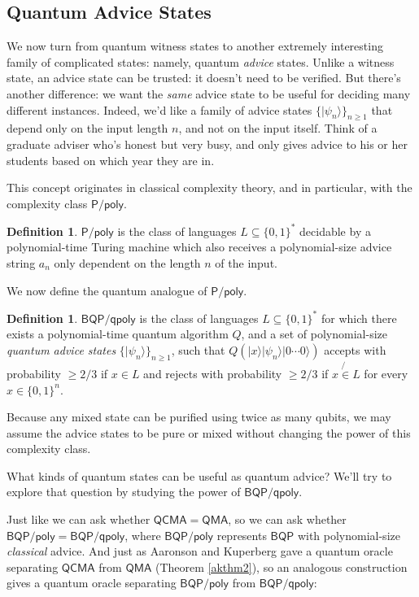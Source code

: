 \documentclass[11pt]{report}
\theoremstyle{plain}
\theoremstyle{definition}
\newtheorem{definition}[theorem]{Definition}
\renewcommand{\ket}[1]{|#1\rangle}
\begin{document}
\subsection{Quantum Advice States}

We now turn from quantum witness states to another extremely interesting family of complicated states: namely, quantum {\em advice} states.  Unlike a witness state, an advice state can
be trusted: it doesn't need to be verified.  But there's another difference: we want the {\em same} advice state to be useful for deciding many different instances.  Indeed, we'd like
a family of advice states $\{ \ket{\psi_n} \}_{n \geq 1}$ that depend only on the input length $n$, and not on the input itself.  Think of a graduate adviser who's honest but very busy, and only gives advice to his or her students based on which year they are in.

This concept originates in classical complexity theory, and in particular, with the complexity class $\mathsf{P/poly}$.

\begin{definition}
  $\mathsf{P/poly}$ is the class of languages $L\subseteq \{0,1\}^*$ decidable by a polynomial-time Turing machine
  which also receives a polynomial-size advice string $a_n$ only dependent on the length $n$ of the input.
\end{definition}

We now define the quantum analogue of $\mathsf{P/poly}$.

\begin{definition}
  $\mathsf{BQP/qpoly}$ is the class of languages $L \subseteq \{ 0, 1 \}^*$ for which
  there exists a polynomial-time quantum algorithm $Q$, and a set of polynomial-size
  {\em quantum advice states} $\{ \ket{\psi_n} \}_{n\geq 1}$, such that
  $Q ( \ket{ x } \ket{ \psi_n} \ket{ 0 \cdots 0})$ accepts with probability $\geqslant 2 / 3$ if $x \in L$ and
  rejects with probability $\geqslant 2 / 3$ if $x \not{\in} L$ for every $x
  \in \{ 0, 1 \}^n$.
\end{definition}

Because any mixed state can be purified using twice as many qubits, we may assume the advice states to be pure or mixed without changing the power of this complexity class.

What kinds of quantum states can be useful as quantum advice?  We'll try to explore that question by studying the power of $\mathsf{BQP/qpoly}$.

Just like we can ask whether $\mathsf{QCMA}=\mathsf{QMA}$, so we can ask whether $\mathsf{BQP/poly}=\mathsf{BQP/qpoly}$, where $\mathsf{BQP/poly}$ represents
$\mathsf{BQP}$ with polynomial-size {\em classical} advice.  And just as Aaronson and Kuperberg \cite{ak} gave a quantum oracle separating $\mathsf{QCMA}$ from $\mathsf{QMA}$
(Theorem \ref{akthm2}), so an analogous construction gives a quantum oracle separating $\mathsf{BQP/poly}$ from $\mathsf{BQP/qpoly}$:
\end{document}
